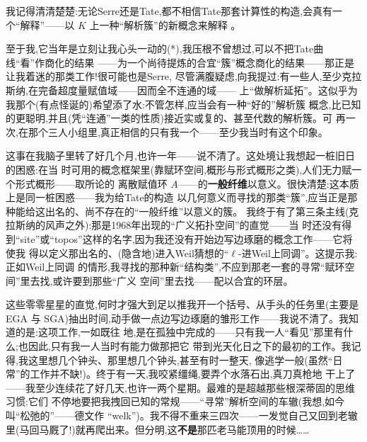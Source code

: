 我记得清清楚楚:无论Serre还是Tate,都不相信Tate那套计算性的构造,会真有一个“解释”——以
$K$ 上一种“解析簇”的新概念来解释
。

至于我,它当年是立刻让我心头一动的(*),我压根不曾想过,可以不把Tate曲线“看”作商化的结果
——为一个尚待提炼的合宜“簇”概念商化的结果——那正是让我着迷的那类工作!很可能也是Serre,
尽管满腹疑虑,向我提过:有一些人,至少克拉斯纳,在完备超度量赋值域——因而全不连通的域——
上“做解析延拓”。这似乎为我那个(有点怪诞的)希望添了水:不管怎样,应当会有一种“好的”解析簇
概念,比已知的更聪明,并且(凭“连通”一类的性质)接近实或复的、甚至代数的\dmark{}解析簇。可
再一次,在那个三人小组里,真正相信的只有我一个——至少我当时有这个印象。

这事在我脑子里转了好几个月,也许一年——说不清了。这处境让我想起一桩旧日的困惑:在当
时可用的概念框架里(靠赋环空间,概形与形式概形之类),人们无力赋一个形式概形——取所论的
离散赋值环 $A$——的\textbf{一般纤维}以意义。很快清楚:这本质上是同一桩困惑——我为给Tate的构造
以几何意义而寻找的那类“簇”,应当正是那种能给这出名的、尚不存在的“一般纤维”以意义的簇。
我终于有了第三条主线(克拉斯纳的风声之外):那是1968年出现的“广义拓扑空间”的直觉——当
时还没有得到“site”或“topos”这样的名字,因为我还没有开始边写边琢磨的概念工作——它将使我
得以定义那出名的、(隐含地)进入Weil猜想的“$\ell$-进Weil上同调”。这提示我:正如Weil上同调
的情形,我寻找的那种新“结构类”,不应到那老一套的寻常“赋环空间”里去找,或许要到那些“广义
空间”里去找——配以合宜的环层。

这些零零星星的直觉,何时才强大到足以推我开一个括号、从手头的任务里(主要是 EGA 与
SGA)抽出时间,动手做一点边写边琢磨的雏形工作——我说不清了。我知道的是:这项工作,一如既往
地,是在孤独中完成的——只有我一人“看见”那里有什么;也因此,只有我一人当时有能力做那把它
带到光天化日之下的最初的工作。我记得,我这里想几个钟头、那里想几个钟头,甚至有时一整天,
像逃学一般(虽然“日常”的工作并不缺!)。终于有一天,我咬紧缰绳,要弄个水落石出,真刀真枪地
干上了——我至少连续花了好几天,也许一两个星期。最难的是超越那些根深蒂固的思维习惯:它们
不停地要把我拽回已知的常规——“寻常”解析空间的车辙(我想,如今叫“松弛的”——德文作
“welk”)。我不得不重来三四次——一发觉自己又回到老辙里(马回马厩了!)就再爬出来\dmark{}。但分明,这\textbf{不是}那匹老马能顶用的时候……


